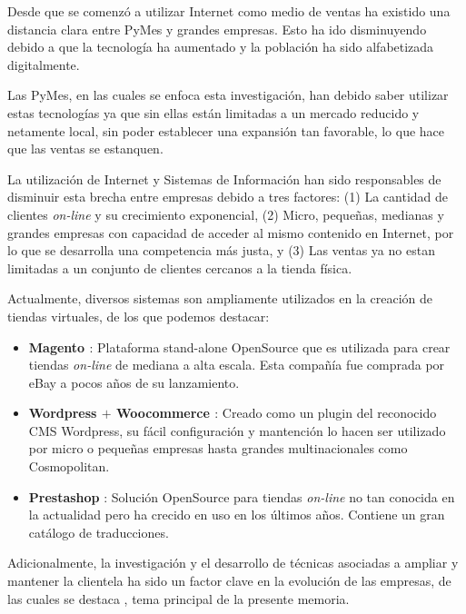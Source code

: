 Desde que se comenzó a utilizar Internet como medio de ventas ha existido una
distancia clara entre PyMes y grandes empresas. Esto ha 
ido disminuyendo debido a que la tecnología ha aumentado y la población
ha sido alfabetizada digitalmente.

Las PyMes, en las cuales se enfoca esta investigación, han debido
saber utilizar estas tecnologías ya que sin ellas están limitadas a un mercado reducido
 y netamente local, sin poder establecer una expansión tan favorable, lo que hace que las ventas se estanquen.

La utilización de Internet y Sistemas de Información han sido responsables de disminuir 
esta brecha entre empresas debido a tres factores: (1) La cantidad de clientes \emph{on-line}
y su crecimiento exponencial, (2) Micro, pequeñas, medianas y grandes empresas con capacidad
de acceder al mismo contenido en Internet, por lo que se desarrolla una competencia
más justa, y (3) Las ventas ya no estan limitadas a un conjunto de clientes
cercanos a la tienda física.

Actualmente, diversos sistemas son ampliamente utilizados en la creación
de tiendas virtuales, de los que podemos destacar:

\begin{itemize}
    \item {\bf Magento \cite{Magento} }:
        Plataforma stand-alone OpenSource que es utilizada para crear tiendas \emph{on-line}
        de mediana a alta escala.
        Esta compañía fue comprada por eBay a pocos años de su lanzamiento.

    \item {\bf Wordpress \cite{Wordpress} $+$ Woocommerce \cite{Woocommerce}}:
        Creado como un plugin del reconocido CMS Wordpress, su fácil configuración
        y mantención lo hacen ser utilizado por micro o pequeñas empresas hasta
        grandes multinacionales como Cosmopolitan.

    \item {\bf Prestashop} \cite{Prestashop}:
        Solución OpenSource para tiendas \emph{on-line} no tan conocida en la actualidad
        pero ha crecido en uso en los últimos años.
        Contiene un gran catálogo de traducciones.

\end{itemize}

Adicionalmente, la investigación y el desarrollo de técnicas asociadas a ampliar
y mantener la clientela ha sido un factor clave en la evolución de las empresas,
de las cuales se destaca {\gam}, tema principal de la presente memoria.

